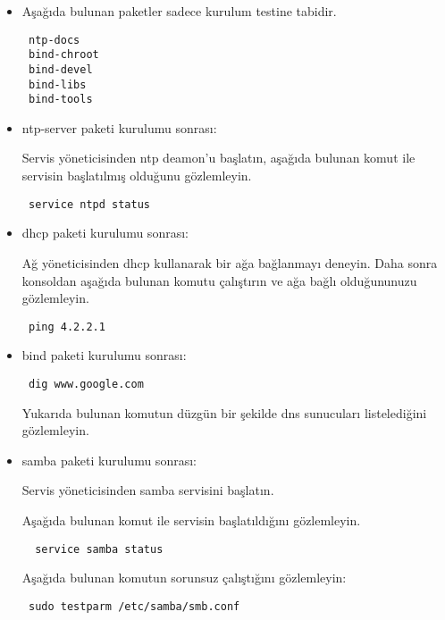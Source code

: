 \documentclass[a4paper,10pt]{article}
\begin{document}
\begin{itemize}
\item Aşağıda bulunan paketler sadece kurulum testine tabidir.

\begin{verbatim}
 ntp-docs
 bind-chroot
 bind-devel
 bind-libs
 bind-tools
\end{verbatim}

\item ntp-server paketi kurulumu sonrası:

Servis yöneticisinden ntp deamon'u başlatın, aşağıda bulunan komut ile servisin başlatılmış olduğunu gözlemleyin.
\begin{verbatim}
 service ntpd status
\end{verbatim}


 \item dhcp paketi kurulumu sonrası:

Ağ yöneticisinden dhcp kullanarak bir ağa bağlanmayı deneyin. Daha sonra konsoldan aşağıda bulunan komutu çalıştırın ve ağa bağlı olduğununuzu gözlemleyin.
\begin{verbatim}
 ping 4.2.2.1
\end{verbatim}

\item bind paketi kurulumu sonrası:
\begin{verbatim}
 dig www.google.com
\end{verbatim}
Yukarıda bulunan komutun düzgün bir şekilde dns sunucuları listelediğini gözlemleyin.

\item samba paketi kurulumu sonrası:

Servis yöneticisinden samba servisini başlatın.

Aşağıda bulunan komut ile servisin başlatıldığını gözlemleyin.
\begin{verbatim}
  service samba status 
\end{verbatim}

 Aşağıda bulunan komutun sorunsuz çalıştığını gözlemleyin:
\begin{verbatim}
 sudo testparm /etc/samba/smb.conf
\end{verbatim}

\end{itemize}
\end{document}
